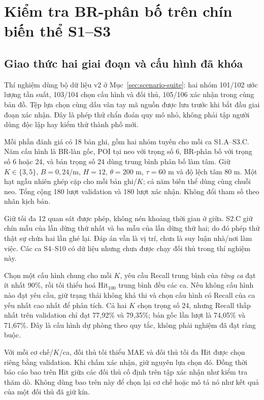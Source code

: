 \section{Kiểm tra BR-phân bố trên chín biến thể S1--S3}
\label{sec:belief-experiment}

\subsection{Giao thức hai giai đoạn và cấu hình đã khóa}

Thí nghiệm dùng bộ dữ liệu v2 ở Mục~\ref{sec:scenario-suite}: hai nhóm 101/102 ước lượng tần suất, 103/104 chọn cấu hình và đối thủ, 105/106 xác nhận trong cùng bản đồ. Tệp lựa chọn cùng dấu vân tay mã nguồn được lưu trước khi bắt đầu giai đoạn xác nhận. Đây là phép thử chẩn đoán quy mô nhỏ, không phải tập người dùng độc lập hay kiểm thử thành phố mới.

Mỗi phần đánh giá có 18 bản ghi, gồm hai nhóm tuyến cho mỗi ca S1.A--S3.C. Năm cấu hình là BR-làn gốc, POI tại neo với trọng số 6, BR-phân bố với trọng số 6 hoặc 24, và bản trọng số 24 dùng trung bình phân bố làm tâm. Giữ $K\in\{3,5\}$, $B=0{,}24/\mathrm m$, $H=12$, $\theta=200$ m, $\tau=60$ m và độ lệch tâm 80 m. Một hạt ngẫu nhiên ghép cặp cho mỗi bản ghi/$K$; cả năm biến thể dùng cùng chuỗi neo. Tổng cộng 180 lượt validation và 180 lượt xác nhận. Không đổi tham số theo nhãn kịch bản.

Giữ tối đa 12 quan sát được phép, không nén khoảng thời gian ở giữa. S2.C giữ chín mẫu của lần dừng thứ nhất và ba mẫu của lần dừng thứ hai; do đó phép thử thật sự chứa hai lần ghé lại. Đáp án vẫn là vị trí, chưa là suy luận nhà/nơi làm việc. Các ca S4--S10 có dữ liệu nhưng chưa được chạy đối thủ trong thí nghiệm này.

Chọn một cấu hình chung cho mỗi $K$, yêu cầu Recall trung bình của \emph{từng ca} đạt ít nhất 90\%, rồi tối thiểu hoá Hit$_{100}$ trung bình đều các ca. Nếu không cấu hình nào đạt yêu cầu, giữ trạng thái không khả thi và chọn cấu hình có Recall của ca yếu nhất cao nhất để phân tích. Cả hai $K$ chọn trọng số 24, nhưng Recall thấp nhất trên validation chỉ đạt 77,92\% và 79,35\%; bản gốc lần lượt là 74,05\% và 71,67\%. Đây là cấu hình dự phòng theo quy tắc, không phải nghiệm đã đạt ràng buộc.

Với mỗi cơ chế/$K$/ca, đối thủ tối thiểu MAE và đối thủ tối đa Hit được chọn riêng bằng validation. Khi chấm xác nhận, giữ nguyên lựa chọn đó. Đồng thời báo cáo bao trên Hit giữa các đối thủ cố định trên tập xác nhận như kiểm tra thăm dò. Không dùng bao trên này để chọn lại cơ chế hoặc mô tả nó như kết quả của một đối thủ đã giữ kín.

